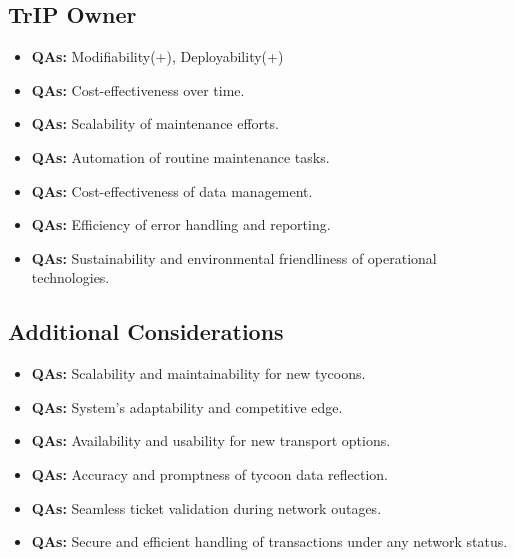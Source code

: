 \subsection{TrIP Owner}
\begin{itemize}
    \item \userStoryFortyOne \textbf{QAs:} Modifiability(+), Deployability(+)
    \item \userStoryTwentyNine \textbf{QAs:} Cost-effectiveness over time.
    \item \userStoryThirty \textbf{QAs:} Scalability of maintenance efforts.
    \item \userStoryThirtyOne \textbf{QAs:} Automation of routine maintenance tasks.
    \item \userStoryThirtyTwo \textbf{QAs:} Cost-effectiveness of data management.
    \item \userStoryThirtyThree \textbf{QAs:} Efficiency of error handling and reporting.
    \item \userStoryThirtyFour \textbf{QAs:} Sustainability and environmental friendliness of operational technologies.
\end{itemize}

\subsection{Additional Considerations}
\begin{itemize}
    \item \userStoryThirtyFive \textbf{QAs:} Scalability and maintainability for new tycoons.
    \item \userStoryThirtySix \textbf{QAs:} System's adaptability and competitive edge.
    \item \userStoryThirtySeven \textbf{QAs:} Availability and usability for new transport options.
    \item \userStoryThirtyEight \textbf{QAs:} Accuracy and promptness of tycoon data reflection.
    \item \userStoryThirtyNine \textbf{QAs:} Seamless ticket validation during network outages.
    \item \userStoryForty \textbf{QAs:} Secure and efficient handling of transactions under any network status.
\end{itemize}

